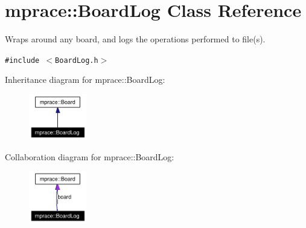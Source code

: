 \hypertarget{classmprace_1_1BoardLog}{
\section{mprace::Board\-Log Class Reference}
\label{classmprace_1_1BoardLog}
}
Wraps around any board, and logs the operations performed to file(s).  


{\tt \#include $<$Board\-Log.h$>$}

Inheritance diagram for mprace::Board\-Log:\begin{figure}[H]
\begin{center}
\leavevmode
\includegraphics[width=71pt]{classmprace_1_1BoardLog__inherit__graph}
\end{center}
\end{figure}
Collaboration diagram for mprace::Board\-Log:\begin{figure}[H]
\begin{center}
\leavevmode
\includegraphics[width=71pt]{classmprace_1_1BoardLog__coll__graph}
\end{center}
\end{figure}
